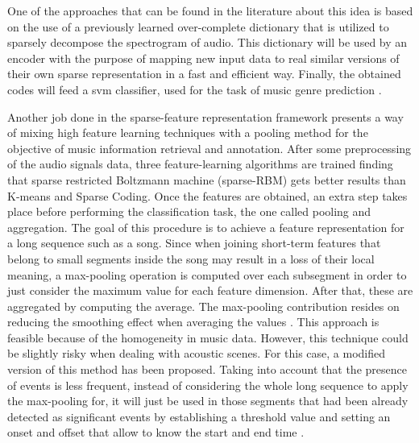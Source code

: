	One of the approaches that can be found in the literature about this idea is based on the use of a previously learned over-complete dictionary that is utilized to sparsely decompose the spectrogram of audio. This dictionary will be used by an encoder with the purpose of mapping new input data to real similar versions of their own sparse representation in a fast and efficient way. Finally, the obtained codes will feed a \acrfull{svm} classifier, used for the task of music genre prediction \cite{Henaff2011}. 
	
	Another job done in the sparse-feature representation framework presents a way of mixing high feature learning techniques with a pooling method for the objective of music information retrieval and annotation. After some preprocessing of the audio signals data, three feature-learning algorithms are trained finding that sparse restricted Boltzmann machine (sparse-RBM) gets better results than K-means and Sparse Coding. Once the features are obtained, an extra step takes place before performing the classification task, the one called pooling and aggregation. The goal of this procedure is to achieve a feature representation for a long sequence such as a song. Since when joining short-term features that belong to small segments inside the song may result in a loss of their local meaning, a max-pooling operation is computed over each subsegment in order to just consider the maximum value for each feature dimension. After that, these are aggregated by computing the average. The max-pooling contribution resides on reducing the smoothing effect when averaging the values \cite{Nam2012}. This approach is feasible because of the homogeneity in music data. However, this technique could be slightly risky when dealing with acoustic scenes. For this case, a modified version of this method has been proposed. Taking into account that the presence of events is less frequent, instead of considering the whole long sequence to apply the max-pooling for, it will just be used in those segments that had been already detected as significant events by establishing a threshold value and setting an onset and offset that allow to know the start and end time \cite{Lee2013}. 
	
